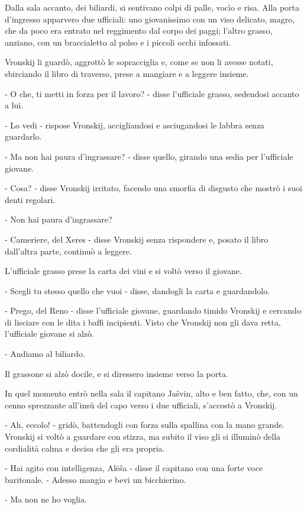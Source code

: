 Dalla sala accanto, dei biliardi, si sentivano colpi di palle, vocìo e risa. Alla porta d'ingresso apparvero due ufficiali: uno giovanissimo con un viso delicato, magro, che da poco era entrato nel reggimento dal corpo dei paggi; l'altro grasso, anziano, con un braccialetto al polso e i piccoli occhi infossati. 

Vronskij li guardò, aggrottò le sopracciglia e, come se non li avesse notati, sbirciando il libro di traverso, prese a mangiare e a leggere insieme. 

- O che, ti metti in forza per il lavoro? - disse l'ufficiale grasso, sedendosi accanto a lui. 

- Lo vedi - rispose Vronskij, accigliandosi e asciugandosi le labbra senza guardarlo. 

- Ma non hai paura d'ingrassare? - disse quello, girando una sedia per l'ufficiale giovane. 

- Cosa? - disse Vronskij irritato, facendo una smorfia di disgusto che mostrò i suoi denti regolari. 

- Non hai paura d'ingrassare? 

- Cameriere, del Xeres - disse Vronskij senza rispondere e, posato il libro dall'altra parte, continuò a leggere. 

L'ufficiale grasso prese la carta dei vini e si voltò verso il giovane. 

- Scegli tu stesso quello che vuoi - disse, dandogli la carta e guardandolo. 

- Prego, del Reno - disse l'ufficiale giovane, guardando timido Vronskij e cercando di lisciare con le dita i baffi incipienti. Visto che Vronskij non gli dava retta, l'ufficiale giovane si alzò. 

- Andiamo al biliardo. 

Il grassone si alzò docile, e si diressero insieme verso la porta. 

In quel momento entrò nella sala il capitano Jašvin, alto e ben fatto, che, con un cenno sprezzante all'insù del capo verso i due ufficiali, s'accostò a Vronskij. 

- Ah, eccolo! - gridò, battendogli con forza sulla spallina con la mano grande. Vronskij si voltò a guardare con stizza, ma subito il viso gli si illuminò della cordialità calma e decisa che gli era propria. 

- Hai agito con intelligenza, Alëša - disse il capitano con una forte voce baritonale. - Adesso mangia e bevi un bicchierino. 

- Ma non ne ho voglia. 

